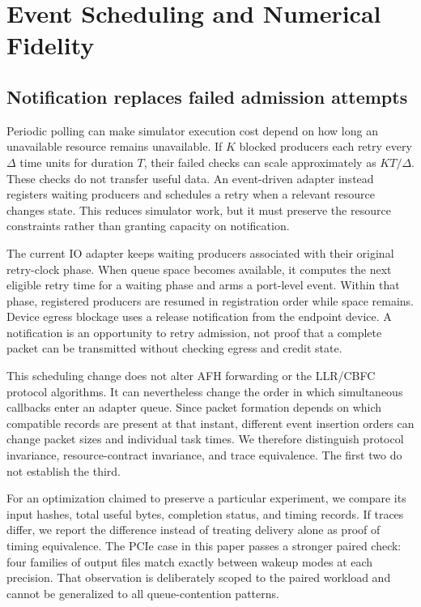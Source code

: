 \section{Event Scheduling and Numerical Fidelity}
\subsection{Notification replaces failed admission attempts}
Periodic polling can make simulator execution cost depend on how long an unavailable resource remains unavailable. If $K$ blocked producers each retry every $\Delta$ time units for duration $T$, their failed checks can scale approximately as $KT/\Delta$. These checks do not transfer useful data. An event-driven adapter instead registers waiting producers and schedules a retry when a relevant resource changes state. This reduces simulator work, but it must preserve the resource constraints rather than granting capacity on notification.

The current IO adapter keeps waiting producers associated with their original retry-clock phase. When queue space becomes available, it computes the next eligible retry time for a waiting phase and arms a port-level event. Within that phase, registered producers are resumed in registration order while space remains. Device egress blockage uses a release notification from the endpoint device. A notification is an opportunity to retry admission, not proof that a complete packet can be transmitted without checking egress and credit state.

This scheduling change does not alter AFH forwarding or the LLR/CBFC protocol algorithms. It can nevertheless change the order in which simultaneous callbacks enter an adapter queue. Since packet formation depends on which compatible records are present at that instant, different event insertion orders can change packet sizes and individual task times. We therefore distinguish protocol invariance, resource-contract invariance, and trace equivalence. The first two do not establish the third.

For an optimization claimed to preserve a particular experiment, we compare its input hashes, total useful bytes, completion status, and timing records. If traces differ, we report the difference instead of treating delivery alone as proof of timing equivalence. The PCIe case in this paper passes a stronger paired check: four families of output files match exactly between wakeup modes at each precision. That observation is deliberately scoped to the paired workload and cannot be generalized to all queue-contention patterns.

